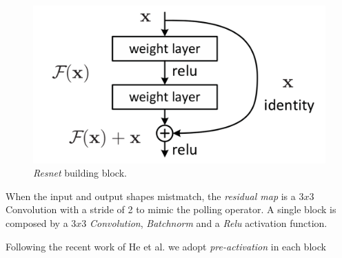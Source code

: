 \documentclass[../document.tex]{subfiles}
\begin{document}
\begin{figure}[H]
	\centering
	\includegraphics[scale=0.3]{img/implementation/estimator/resnet_block.png}
	\caption{\emph{Resnet} building block.}
\end{figure}
When the input and output shapes mistmatch, the \emph{residual map} is a $3x3$ Convolution with a stride of 2 to mimic the polling operator. A single block is composed by a $3x3$ \emph{Convolution}, \emph{Batchnorm} and a \emph{Relu} activation function. 

Following the recent work of He et al. \cite{he2015identity} we adopt \emph{pre-activation} in each block
\end{document}

